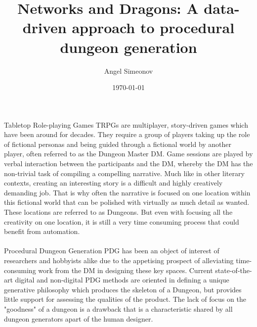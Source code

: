 \documentclass{UoYCSproject}
\author{Angel Simeonov}
\title{Networks and Dragons: A data-driven approach to procedural dungeon generation}
\date{\today}
\begin{document}
\maketitle
\listoffigures
\listoftables

\begin{summary}



\paragraph{}
Tabletop Role-playing Games TRPGs are multiplayer, story-driven games which have been around for decades. They require a group of players taking up the role of fictional personas and being guided through a fictional world by another player, often referred to as the Dungeon Master DM. Game sessions are played by verbal interaction between the participants and the DM, whereby the DM has the non-trivial task of compiling a compelling narrative. Much like in other literary contexts, creating an interesting story is a difficult and highly creatively demanding job. That is why often the narrative is focused on one location within this fictional world that can be polished with virtually as much detail as wanted. These locations are referred to as Dungeons. But even with focusing all the creativity on one location, it is still a very time consuming process that could benefit from automation.

\paragraph{}
Procedural Dungeon Generation PDG has been an object of interest of researchers and hobbyists alike due to the appetising prospect of alleviating time-consuming work from the DM in designing these key spaces. Current state-of-the-art digital and non-digital PDG methods are oriented in defining a unique generative philosophy which produces the skeleton of a Dungeon, but provides little support for assessing the qualities of the product. The lack of focus on the "goodness" of a dungeon is a drawback that is a characteristic shared by all dungeon generators apart of the human designer.


\end{summary}
\end{document}

